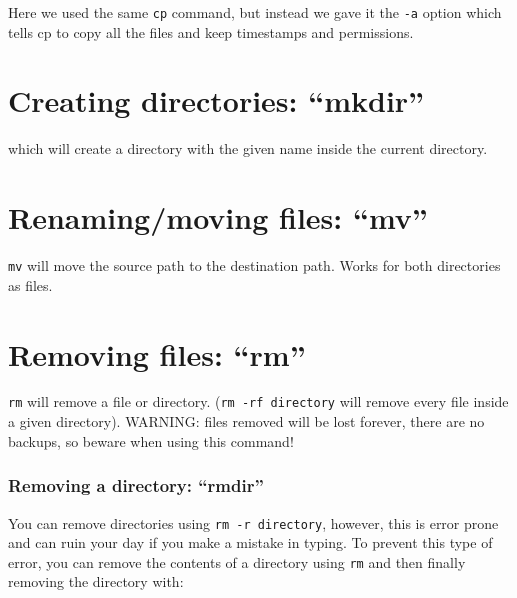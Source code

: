 Here we used the same \verb|cp| command, but instead we gave it the \verb|-a| option
which tells cp to copy all the files and keep timestamps and permissions.

\section{Creating directories: ``mkdir''}

\begin{prompt}
\end{prompt}

which will create a directory with the given name inside the current directory.

\section{Renaming/moving files: ``mv''}

\begin{prompt}
\end{prompt}

\verb|mv| will move the source path to the destination path. Works for both directories as files.

\section{Removing files: ``rm''}


\begin{prompt}
\end{prompt}

\verb|rm| will remove a file or directory. (\verb|rm -rf directory| will remove every
file inside a given directory). WARNING: files removed will be lost forever,
there are no backups, so beware when using this command!

\subsubsection{Removing a directory: ``rmdir''}

You can remove directories using \verb|rm -r directory|, however, this is error
prone and can ruin your day if you make a mistake in typing. To prevent this
type of error, you can remove the contents of a directory using \verb|rm|
and then finally removing the directory with:

